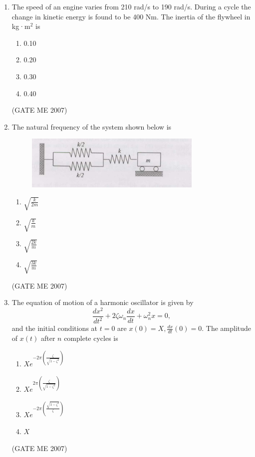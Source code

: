 \documentclass[journal]{IEEEtran}
\begin{document}
\begin{enumerate}
\item The speed of an engine varies from 210 rad/s to 190 rad/s. During a cycle the change in kinetic energy is found to be 400 Nm. The inertia of the flywheel in kg·m$^2$ is
\begin{multicols}{4}
\begin{enumerate}
\item 0.10
\item 0.20
\item 0.30
\item 0.40
\end{enumerate}
\end{multicols}
\hfill (GATE ME 2007)

\item The natural frequency of the system shown below is

\begin{figure}[H]
    \centering
    \includegraphics[width=0.8\textwidth]{Fig 8.png}
    \caption{}
    \label{fig:question52}
\end{figure}

\begin{multicols}{4}
\begin{enumerate}
\item $ \sqrt{\frac{k}{2m}} $
\item $ \sqrt{\frac{k}{m}} $
\item $ \sqrt{\frac{2k}{m}} $
\item $ \sqrt{\frac{3k}{m}} $
\end{enumerate}
\end{multicols}
\hfill (GATE ME 2007)

\item The equation of motion of a harmonic oscillator is given by  
\[\frac{dx^2}{dt^2} + 2\zeta \omega_n \frac{dx}{dt} + \omega_n^2 x = 0,\]  
and the initial conditions at $ t = 0 $ are $ x(0) = X, \frac{dx}{dt}(0) = 0 $. The amplitude of $ x(t) $ after $ n $ complete cycles is

\begin{multicols}{2}
\begin{enumerate}
\item $ Xe^{-2\pi \left( \frac{\zeta}{\sqrt{1 - \zeta^2}} \right)} $
\item $ Xe^{2\pi \left( \frac{\zeta}{\sqrt{1 - \zeta^2}} \right)} $
\item $ Xe^{-2\pi \left( \frac{\sqrt{1 - \zeta^2}}{\zeta} \right)} $
\item $ X $
\end{enumerate}
\end{multicols}
\hfill (GATE ME 2007)


\end{enumerate}
\end{document}
